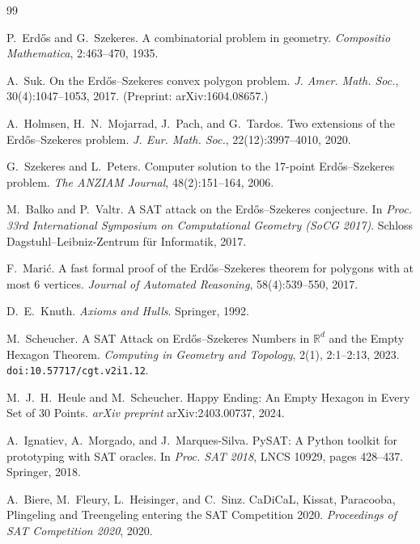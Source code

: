 \documentclass[11pt,a4paper]{article}
\theoremstyle{definition}
\begin{document}
\begin{thebibliography}{99}

P.~Erd\H{o}s and G.~Szekeres.
\newblock A combinatorial problem in geometry.
\newblock \emph{Compositio Mathematica}, 2:463--470, 1935.

A.~Suk.
\newblock On the Erd\H{o}s--Szekeres convex polygon problem.
\newblock \emph{J. Amer. Math. Soc.}, 30(4):1047--1053, 2017.
\newblock (Preprint: arXiv:1604.08657.)

A.~Holmsen, H.~N.~Mojarrad, J.~Pach, and G.~Tardos.
\newblock Two extensions of the Erd\H{o}s--Szekeres problem.
\newblock \emph{J. Eur. Math. Soc.}, 22(12):3997--4010, 2020.

G.~Szekeres and L.~Peters.
\newblock Computer solution to the 17-point Erd\H{o}s--Szekeres problem.
\newblock \emph{The ANZIAM Journal}, 48(2):151--164, 2006.

M.~Balko and P.~Valtr.
\newblock A SAT attack on the Erd\H{o}s--Szekeres conjecture.
\newblock In \emph{Proc. 33rd International Symposium on Computational Geometry (SoCG 2017)}.
\newblock Schloss Dagstuhl--Leibniz-Zentrum f\"ur Informatik, 2017.

F.~Mari\'c.
\newblock A fast formal proof of the Erd\H{o}s--Szekeres theorem for polygons with at most 6 vertices.
\newblock \emph{Journal of Automated Reasoning}, 58(4):539--550, 2017.

D.~E.~Knuth.
\newblock \emph{Axioms and Hulls}.
\newblock Springer, 1992.

M.~Scheucher.
\newblock A SAT Attack on Erd\H{o}s--Szekeres Numbers in $\mathbb{R}^d$ and the Empty Hexagon Theorem.
\newblock \emph{Computing in Geometry and Topology}, 2(1), 2:1--2:13, 2023.
\newblock \texttt{doi:10.57717/cgt.v2i1.12}.

M.~J.~H.~Heule and M.~Scheucher.
\newblock Happy Ending: An Empty Hexagon in Every Set of 30 Points.
\newblock \emph{arXiv preprint} arXiv:2403.00737, 2024.

A.~Ignatiev, A.~Morgado, and J.~Marques-Silva.
\newblock PySAT: A Python toolkit for prototyping with SAT oracles.
\newblock In \emph{Proc. SAT 2018}, LNCS 10929, pages 428--437. Springer, 2018.

A.~Biere, M.~Fleury, L.~Heisinger, and C.~Sinz.
\newblock CaDiCaL, Kissat, Paracooba, Plingeling and Treengeling entering the SAT Competition 2020.
\newblock \emph{Proceedings of SAT Competition 2020}, 2020.

\end{thebibliography}
\end{document}
